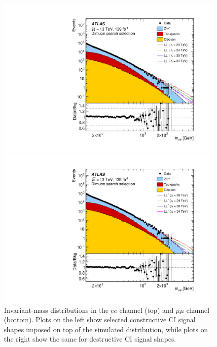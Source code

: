 {\begin{figure}[h!]
\begin{minipage}[b]{.45\linewidth}
    \includegraphics[width=1\textwidth]{figures/ci/dataMc/figaux_06a.pdf}
    \subcaption{}
\end{minipage}
\begin{minipage}[b]{.45\linewidth}
    \includegraphics[width=1\textwidth]{figures/ci/dataMc/figaux_06b.pdf}
    \subcaption{}
\end{minipage}
\caption{Invariant-mass distributions in the $ee$ channel (top) and $\mu\mu$ channel (bottom). Plots on the left show selected constructive CI signal shapes imposed on top of the simulated distribution, while plots on the right show the same for destructive CI signal shapes.}
\label{fig:ciMassMcPlot}
\end{figure}
\clearpage
}


